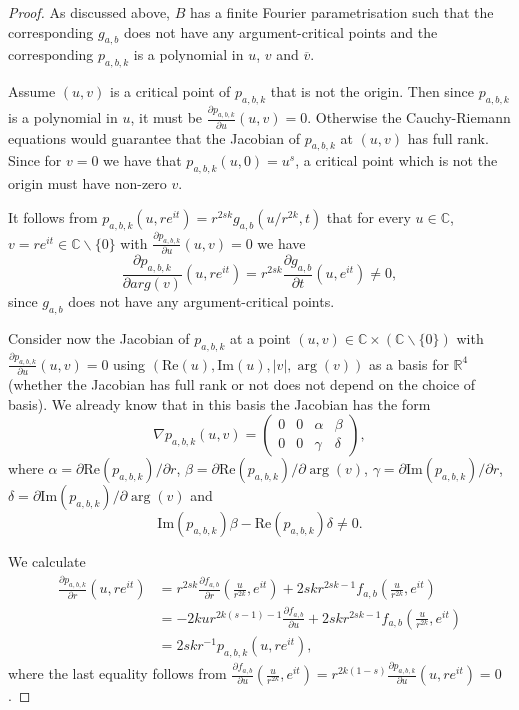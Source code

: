 \documentclass[notitlepage,12pt]{revtex4-1}
\begin{document}
\begin{proof}
As discussed above, $B$ has a finite Fourier parametrisation such that the corresponding $g_{a,b}$ does not have any argument-critical points and the corresponding $p_{a,b,k}$ is a polynomial in $u$, $v$ and $\overline{v}$.

Assume $(u,v)$ is a critical point of $p_{a,b,k}$ that is not the origin. Then since $p_{a,b,k}$ is a polynomial in $u$, it must be $\frac{\partial p_{a,b,k}}{\partial u}(u,v)=0$. Otherwise the Cauchy-Riemann equations would guarantee that the Jacobian of $p_{a,b,k}$ at $(u,v)$ has full rank. Since for $v=0$ we have that $p_{a,b,k}(u,0)=u^{s}$, a critical point which is not the origin must have non-zero $v$.

It follows from $p_{a,b,k}(u,re^{it})=r^{2sk}g_{a,b}(u/r^{2k},t)$ that for every $u\in\mathbb{C}$, $v=re^{it}\in\mathbb{C}\backslash\{0\}$ with $\frac{\partial p_{a,b,k}}{\partial u}(u,v)=0$ we have 
\begin{equation}\frac{\partial p_{a,b,k}}{\partial arg(v)}(u,re^{it})=r^{2sk}\frac{\partial g_{a,b}}{\partial t}(u,e^{it})\neq 0,
\end{equation}
since $g_{a,b}$ does not have any argument-critical points.

Consider now the Jacobian of $p_{a,b,k}$ at a point $(u,v)\in\mathbb{C}\times(\mathbb{C}\backslash \{0\})$ with $\frac{\partial p_{a,b,k}}{\partial u}(u,v)=0$ using $(\mathrm{Re}(u),\mathrm{Im}(u),|v|,\arg(v))$ as a basis for $\mathbb{R}^4$ (whether the Jacobian has full rank or not does not depend on the choice of basis). We already know that in this basis the Jacobian has the form  
\begin{equation}
\label{eq:jacobian}
\nabla p_{a,b,k}(u,v)=
\begin{pmatrix}
0 & 0 & \alpha & \beta\\
0 & 0 & \gamma & \delta
\end{pmatrix},
\end{equation}
where $\alpha=\partial \mathrm{Re}(p_{a,b,k})/\partial r$, $\beta=\partial \mathrm{Re}(p_{a,b,k})/\partial \arg(v)$, $\gamma=\partial \mathrm{Im}(p_{a,b,k})/\partial r$,\\ $\delta=\partial \mathrm{Im}(p_{a,b,k})/\partial \arg(v)$ and 
\begin{equation}
\label{eq:notzero}
\mathrm{Im}(p_{a,b,k})\beta-\mathrm{Re}(p_{a,b,k})\delta\neq 0.
\end{equation}

We calculate 
\begin{align}
\frac{\partial p_{a,b,k}}{\partial r}(u,re^{it})&=r^{2sk}\frac{\partial f_{a,b}}{\partial r}\left(\frac{u}{r^{2k}},e^{it}\right)+2skr^{2sk-1}f_{a,b}\left(\frac{u}{r^{2k}},e^{it}\right)\nonumber \\
&=-2kur^{2k(s-1)-1}\frac{\partial f_{a,b}}{\partial u}+2skr^{2sk-1}f_{a,b}\left(\frac{u}{r^{2k}},e^{it}\right)\nonumber \\
&=2skr^{-1}p_{a,b,k}(u,re^{it}),
\end{align}
where the last equality follows from $\frac{\partial f_{a,b}}{\partial u}\left(\frac{u}{r^{2k}},e^{it}\right)=r^{2k(1-s)}\frac{\partial p_{a,b,k}}{\partial u}(u,re^{it})=0$.


\end{proof}
\end{document}
